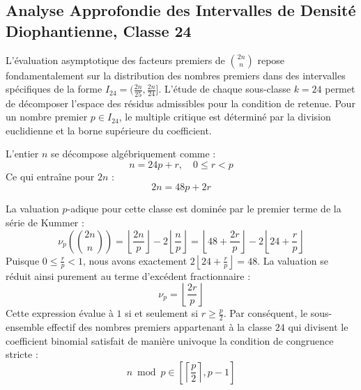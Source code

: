 \documentclass[12pt,a4paper]{article}
\begin{document}
    \newpage
    \subsection{Analyse Approfondie des Intervalles de Densité Diophantienne, Classe 24}
    L'évaluation asymptotique des facteurs premiers de $\binom{2n}{n}$ repose fondamentalement sur la distribution des nombres premiers dans des intervalles spécifiques de la forme $I_24 = (\frac{2n}{25}, \frac{2n}{24}]$.
    L'étude de chaque sous-classe $k = 24$ permet de décomposer l'espace des résidus admissibles pour la condition de retenue.
    Pour un nombre premier $p \in I_24$, le multiple critique est déterminé par la division euclidienne et la borne supérieure du coefficient.

    L'entier $n$ se décompose algébriquement comme :
    \begin{equation}
    n = 24 p + r, \quad 0 \le r < p
    \end{equation}
    Ce qui entraîne pour $2n$ :
    \begin{equation}
    2n = 48 p + 2r
    \end{equation}

    La valuation $p$-adique pour cette classe est dominée par le premier terme de la série de Kummer :
    \begin{equation}
    \nu_p\left( \binom{2n}{n} \right) = \left\lfloor \frac{2n}{p} \right\rfloor - 2 \left\lfloor \frac{n}{p} \right\rfloor = \left\lfloor 48 + \frac{2r}{p} \right\rfloor - 2 \left\lfloor 24 + \frac{r}{p} \right\rfloor
    \end{equation}
    Puisque $0 \le \frac{r}{p} < 1$, nous avons exactement $2 \left\lfloor 24 + \frac{r}{p} \right\rfloor = 48$.
    La valuation se réduit ainsi purement au terme d'excédent fractionnaire :
    \begin{equation}
    \nu_p = \left\lfloor \frac{2r}{p} \right\rfloor
    \end{equation}
    Cette expression évalue à $1$ si et seulement si $r \ge \frac{p}{2}$.
    Par conséquent, le sous-ensemble effectif des nombres premiers appartenant à la classe $24$ qui divisent le coefficient binomial satisfait de manière univoque la condition de congruence stricte :
    \begin{equation}
    n \bmod p \in \left[ \left\lceil \frac{p}{2} \right\rceil, p - 1 \right]
    \end{equation}
\end{document}
